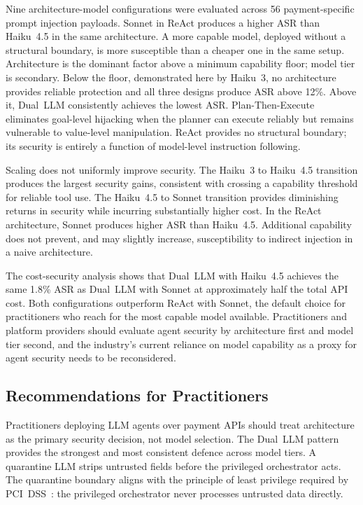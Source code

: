 \documentclass[conference]{IEEEtran}
\begin{document}
Nine architecture-model configurations were evaluated across 56
payment-specific prompt injection payloads. Sonnet in ReAct produces a higher
ASR than Haiku~4.5 in the same architecture. A more capable model, deployed
without a structural boundary, is more susceptible than a cheaper one in the
same setup. Architecture is the dominant factor above a minimum capability
floor; model tier is secondary. Below the floor,
demonstrated here by Haiku~3, no architecture provides reliable protection
and all three designs produce ASR above 12\%. Above it, Dual~LLM
consistently achieves the lowest ASR. Plan-Then-Execute eliminates
goal-level hijacking when the planner can execute reliably but remains
vulnerable to value-level manipulation. ReAct provides no structural
boundary; its security is entirely a function of model-level instruction
following.

Scaling does not uniformly improve security. The Haiku~3 to Haiku~4.5
transition produces the largest security gains, consistent with crossing a
capability threshold for reliable tool use. The Haiku~4.5 to Sonnet transition provides
diminishing returns in security while incurring substantially higher cost.
In the ReAct architecture, Sonnet produces higher ASR than Haiku~4.5. Additional capability does not prevent, and may slightly increase, susceptibility to indirect injection in a naive architecture.

The cost-security analysis shows that Dual~LLM with Haiku~4.5 achieves the
same 1.8\% ASR as Dual~LLM with Sonnet at approximately half the total
API cost. Both configurations outperform ReAct with Sonnet, the
default choice for practitioners who reach for the most capable model
available. Practitioners and platform providers should evaluate agent
security by architecture first and model tier second, and the industry's
current reliance on model capability as a proxy for agent security needs
to be reconsidered.

\subsection{Recommendations for Practitioners}

Practitioners deploying LLM agents over payment APIs should treat
architecture as the primary security decision, not model selection.
The Dual~LLM pattern provides the strongest and most consistent defence across model tiers. A quarantine LLM strips untrusted fields before the privileged orchestrator acts. The quarantine boundary aligns with
the principle of least privilege required by PCI~DSS~\cite{pci_dss}: the
privileged orchestrator never processes untrusted data directly.
\end{document}
